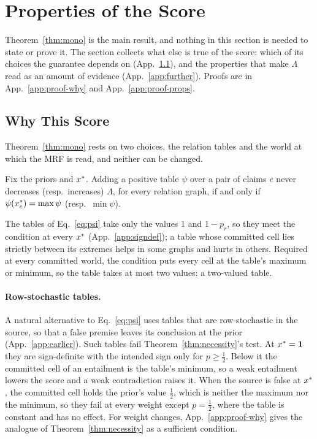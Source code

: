 \section{Properties of the Score}
\label{app:props}

Theorem~\ref{thm:mono} is the main result, and nothing in this section is needed to state or prove
it. The section collects what else is true of the score: which of its choices the guarantee depends
on (App.~\ref{app:why}), and the properties that make $\Lambda$ read as an amount of evidence
(App.~\ref{app:further}). Proofs are in App.~\ref{app:proof-why} and App.~\ref{app:proof-props}.

\subsection{Why This Score}
\label{app:why}

Theorem~\ref{thm:mono} rests on two choices, the relation tables and the world at which the MRF is
read, and neither can be changed.

\begin{theorem}
\label{thm:necessity}
Fix the priors and $x^{\ast}$. Adding a positive table $\psi$ over a pair of claims $e$ never decreases
(resp.\ increases) $\Lambda$, for every relation graph, if and only if $\psi(x^{\ast}_e)=\max\psi$
(resp.\ $\min\psi$).
\end{theorem}

The tables of Eq.~\ref{eq:psi} take only the values $1$ and $1-p_r$, so they meet the condition at
every $x^{\ast}$ (App.~\ref{app:signdef}); a table whose committed cell lies strictly between its
extremes helps in some graphs and hurts in others. Required at every committed world, the condition puts every cell at the table's
maximum or minimum, so the table takes at most two values: a two-valued table.

\paragraph{Row-stochastic tables.}
\label{app:rowstoch}
A natural alternative to Eq.~\ref{eq:psi} uses tables that are
row-stochastic in the source, so that a false premise leaves its conclusion at the prior
(App.~\ref{app:earlier}). Such tables fail Theorem~\ref{thm:necessity}'s test. At $x^{\ast}=\mathbf{1}$ they
are sign-definite with the intended sign only for $p\ge\frac12$. Below it the committed cell of an
entailment is the table's minimum, so a weak entailment lowers the score and a weak contradiction
raises it. When the source is false at $x^{\ast}$, the committed cell holds the prior's value
$\frac12$, which is neither the maximum nor the minimum, so they fail at every weight except
$p=\frac12$, where the table is constant and has no effect. For weight changes,
App.~\ref{app:proof-why} gives the analogue of Theorem~\ref{thm:necessity} as a sufficient
condition.

